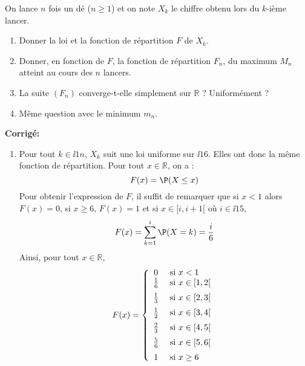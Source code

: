 \documentclass[a4paper,twoside,french,11pt]{VcCours}
\newcommand{\corr}{\textbf{Corrigé:}}
\begin{document}
\begin{Exercice}{} On lance $n$ fois un dé ($n \geq 1$) et on note $X_k$ le chiffre obtenu lors du $k$-ième lancer.
\begin{enumerate}
\item Donner la loi et la fonction de répartition $F$ de $X_k$.
\item Donner, en fonction de $F$, la fonction de répartition $F_n$, du maximum $M_n$ atteint au cours des $n$ lancers.
\item La suite $(F_n)$ converge-t-elle simplement sur $\mathbb{R}$ ? Uniformément ?
\item Même question avec le minimum $m_n$.
\end{enumerate}
\end{Exercice}

\corr \begin{enumerate}
\item Pour tout $k \in \ii{1}{n}$, $X_k$ suit une loi uniforme sur $\ii{1}{6}$. Elles ont donc la même fonction de répartition. Pour tout $x \in \mathbb{R}$, on a :
$$ F(x) = \P(X \leq x)$$
Pour obtenir l'expression de $F$, il suffit de remarquer que si $x<1$ alors $F(x)=0$, si $x \geq 6$, $F(x)=1$ et si $x \in [i,i+1[$ où $i \in \ii{1}{5}$,
$$ F(x) = \sum_{k=1}^{i} \P(X = k) = \dfrac{i}{6}$$
Ainsi, pour tout $x \in \mathbb{R}$,
$$ F(x) = \left\lbrace \begin{array}{cl}
0 & \hbox{ si } x<1\\
\tfrac{1}{6} & \hbox{ si } x \in [1,2[ \\[0.2cm]
\tfrac{1}{3} & \hbox{ si } x \in [2,3[ \\[0.2cm]
\tfrac{1}{2} & \hbox{ si } x \in [3,4[ \\[0.2cm]
\tfrac{2}{3} & \hbox{ si } x \in [4,5[ \\[0.2cm]
\tfrac{5}{6} & \hbox{ si } x \in [5,6[ \\[0.2cm]
1 & \hbox{ si } x \geq 6 \\
\end{array}\right.$$



\end{enumerate}
\end{document}
